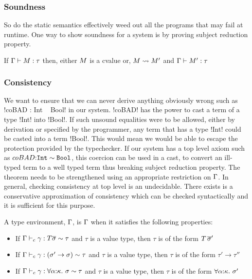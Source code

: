 \documentclass[screen,nonacm]{acmart}
\begin{document}
\subsubsection{Soundness}
So do the static semantics effectively weed out all the programs that may fail at runtime. One way to show soundness for a system is by proving subject reduction property.

\begin{prop}\label{prop:sfc-ty-safety}
 If $\Gamma \vdash M : \tau$ then, either $M$ is a cvalue or, $M \rightsquigarrow M'$ and
 $\Gamma \vdash M' : \tau$
\end{prop}

\subsubsection{Consistency}
We want to ensure that we can never derive anything obviously wrong such as !coBAD : Int ~ Bool! in our system.
!coBAD! has the power to cast a term of a type !Int! into !Bool!. If such unsound equalities were to be allowed, either by derivation or specified by the programmer, any term that has a type !Int! could be casted into a term !Bool!. This would mean we would be able to escape the protection provided by the typechecker.
If our system has a top level axiom such as $coBAD {:} \texttt{Int} \sim \texttt{Bool}$, this coercion can be used in a cast, to convert an ill-typed term to a well typed term thus breaking subject reduction property. The theorem needs to be strengthened using an appropriate restriction on $\TEnv$. In general, checking consistency at top level is an undecidable. There exists is a conservative approximation of consistency which can be checked syntactically and it is sufficient for this purpose.

\begin{definition}[\Good $\TEnv$]
 A type environment, $\TEnv$, is \Good $\TEnv$ when it satisfies the following properties:
 \begin{itemize}
 \item If $\Gamma \vdash_{c} \gamma : T \overline{\sigma} \sim \tau$ and $\tau$ is a value type, then $\tau$ is of the form $T\,\overline{\sigma}'$
 \item If $\Gamma \vdash_{c} \gamma : (\sigma' \to \sigma) \sim \tau$ and $\tau$ is a value type, then $\tau$ is of the form $\tau' \to \tau''$
 \item If $\Gamma \vdash_{c} \gamma : \forall\alpha{:}\kappa.~\sigma \sim \tau$ and $\tau$ is a value type, then $\tau$ is of the form $\forall\alpha{:}\kappa.~\sigma'$
 \end{itemize}
\end{definition}
\end{document}
